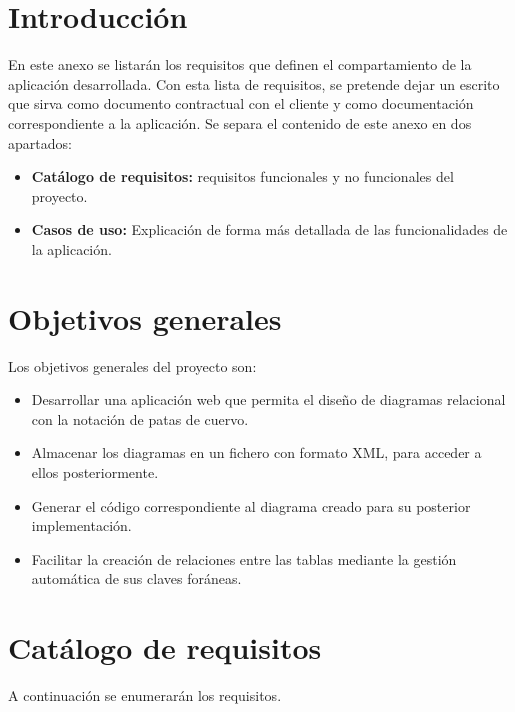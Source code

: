 
\section{Introducción}
En este anexo se listarán los requisitos que definen el compartamiento de la aplicación desarrollada. Con esta lista de requisitos, se pretende dejar un escrito que sirva como documento contractual con el cliente y como documentación correspondiente a la aplicación.
Se separa el contenido de este anexo en dos apartados:
\begin{itemize}
    \item \textbf{Catálogo de requisitos: } requisitos funcionales y no funcionales del proyecto.
    \item \textbf{Casos de uso: }Explicación de forma más detallada de las funcionalidades de la aplicación.
\end{itemize}

\section{Objetivos generales}
Los objetivos generales del proyecto son:
\begin{itemize}
    \item Desarrollar una aplicación web que permita el diseño de diagramas relacional con la notación de patas de cuervo.
    \item Almacenar los diagramas en un fichero con formato XML, para acceder a ellos posteriormente.
    \item Generar el código correspondiente al diagrama creado para su posterior implementación.
    \item Facilitar la creación de relaciones entre las tablas mediante la gestión automática de sus claves foráneas.
\end{itemize}

\section{Catálogo de requisitos}
A continuación se enumerarán los requisitos.

